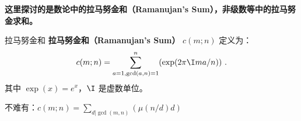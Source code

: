 

\textbf{这里探讨的是数论中的拉马努金和（Ramanujan's Sum），非级数等中的拉马努金求和。}

\begin{definition}{拉马努金和}
\textbf{拉马努金和（Ramanujan's Sum）} $c(m; n)$ 定义为：
\begin{equation}
c(m; n) = \sum_{a=1, \gcd(a, n) = 1}^n (\exp(2\pi \I m a / n)) ~.
\end{equation}
其中 $\exp(x) = e^x$，$\I$ 是虚数单位。
\end{definition}

不难有：$c(m; n) = \sum_{d | \gcd(m, n)} (\mu(n/d) d)$